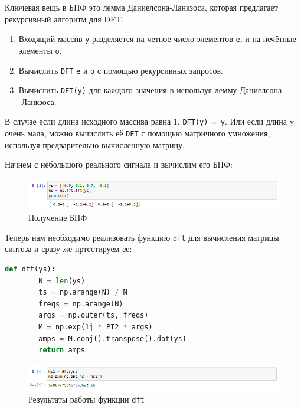 \documentclass[a4paper]{article}
\begin{document}
            Ключевая вещь в БПФ это лемма Даниелсона-Ланкзоса, которая предлагает рекурсивный алгоритм для DFT:
            
            \begin{enumerate}
                \item Входящий массив \texttt{y} разделяется на четное число элементов \texttt{e}, и на нечётные элементы \texttt{o}.
                \item Вычислить \texttt{DFT} \texttt{e} и \texttt{o} с помощью рекурсивных запросов.
                \item Вычислить \texttt{DFT(y)} для каждого значения \texttt{n} используя лемму Даниелсона-\\-Ланкзоса.
            \end{enumerate}

            В случае если длина исходного массива равна 1, \texttt{DFT(y) = y}. Или если длина y очень мала, можно вычислить её \texttt{DFT} с помощью матричного умножения, используя предварительно вычисленную матрицу.
            
            Начнём с небольшого реального сигнала и вычислим его БПФ:
            
             \begin{figure}[H]
                \centering
                \includegraphics[width=\textwidth]{ex_2_fft.png}
                \caption{Получение БПФ}
                \label{fig:ex_2_dfr_result}
            \end{figure}
            
            Теперь нам необходимо реализовать функцию \texttt{dft} для вычисления матрицы синтеза и сразу же пртестируем ее:
            
\begin{lstlisting}[language=Python, caption= Функция \texttt{dft}]
    def dft(ys):
        N = len(ys)
        ts = np.arange(N) / N
        freqs = np.arange(N)
        args = np.outer(ts, freqs)
        M = np.exp(1j * PI2 * args)
        amps = M.conj().transpose().dot(ys)
        return amps
\end{lstlisting}
            
            \begin{figure}[H]
                \centering
                \includegraphics[width=\textwidth]{ex_2_dfr_result.png}
                \caption{Результаты работы функции \texttt{dft}}
                \label{fig:ex_2_dfr_result}
            \end{figure}
            
\end{document}
